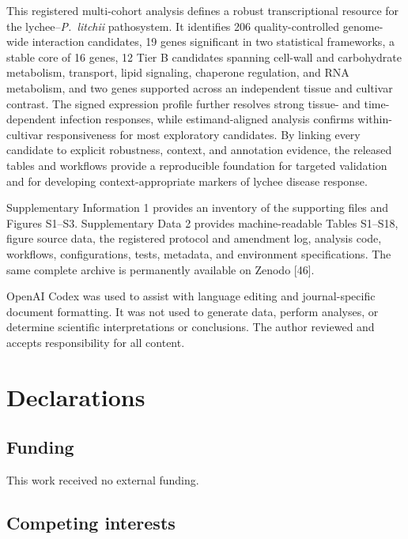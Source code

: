 \documentclass[referee,pdflatex,sn-basic,Numbered]{sn-jnl}
\newcommand{\Pl}{\textit{P.~litchii}}
\begin{document}
This registered multi-cohort analysis defines a robust transcriptional resource for the lychee--\Pl{} pathosystem. It identifies 206 quality-controlled genome-wide interaction candidates, 19 genes significant in two statistical frameworks, a stable core of 16 genes, 12 Tier B candidates spanning cell-wall and carbohydrate metabolism, transport, lipid signaling, chaperone regulation, and RNA metabolism, and two genes supported across an independent tissue and cultivar contrast. The signed expression profile further resolves strong tissue- and time-dependent infection responses, while estimand-aligned analysis confirms within-cultivar responsiveness for most exploratory candidates. By linking every candidate to explicit robustness, context, and annotation evidence, the released tables and workflows provide a reproducible foundation for targeted validation and for developing context-appropriate markers of lychee disease response.

\backmatter


Supplementary Information 1 provides an inventory of the supporting files and Figures S1--S3. Supplementary Data 2 provides machine-readable Tables S1--S18, figure source data, the registered protocol and amendment log, analysis code, workflows, configurations, tests, metadata, and environment specifications. The same complete archive is permanently available on Zenodo [46].


OpenAI Codex was used to assist with language editing and journal-specific document formatting. It was not used to generate data, perform analyses, or determine scientific interpretations or conclusions. The author reviewed and accepts responsibility for all content.

\section*{Declarations}

\subsection*{Funding}

This work received no external funding.

\subsection*{Competing interests}
\end{document}
